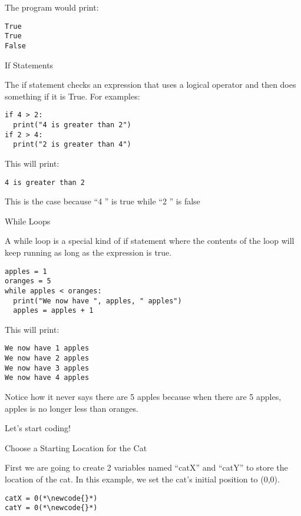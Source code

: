 \documentclass[12pt,oneside]{article}
\newcommand{\q}[1]{``#1''}
\newcommand{\subsectitle}[1]{
  \begin{flushleft}{\large#1}\end{flushleft}
}
\newcommand{\sectitle}[1]{
  \newpage
  \begin{flushleft}{\huge#1}\end{flushleft}
}
\newcommand{\newcode}[0]{\hfill<--}
\begin{document}
The program would print:

\begin{lstlisting}
True
True
False
\end{lstlisting}


\subsectitle{If Statements}

The if statement checks an expression that uses a logical operator and then does something if it is True. For examples:

\begin{lstlisting}
if 4 > 2:
  print("4 is greater than 2")
if 2 > 4:
  print("2 is greater than 4")
\end{lstlisting}

This will print:

\begin{lstlisting}
4 is greater than 2
\end{lstlisting}

This is the case because \q{4 } is true while \q{2 } is false

\subsectitle{While Loops}

A while loop is a special kind of if statement where the contents of the loop will keep running as long as the expression is true.

\begin{lstlisting}
apples = 1
oranges = 5
while apples < oranges:
  print("We now have ", apples, " apples")
  apples = apples + 1
\end{lstlisting}

This will print:

\begin{lstlisting}
We now have 1 apples
We now have 2 apples
We now have 3 apples
We now have 4 apples
\end{lstlisting}

Notice how it never says there are 5 apples because when there are 5 apples, apples is no longer less than oranges.

\sectitle{Let's start coding!}

\begin{minipage}{\textwidth}
\subsectitle{Choose a Starting Location for the Cat}

First we are going to create 2 variables named \q{catX} and \q{catY} to store the location of the cat. In this example, we set the cat's initial position to (0,0).

\begin{lstlisting}
catX = 0(*\newcode{}*)
catY = 0(*\newcode{}*)
\end{lstlisting}
\end{minipage}
\end{document}
